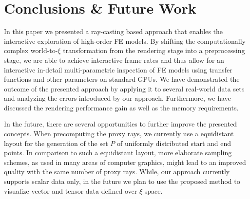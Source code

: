 \documentclass[journal]{vgtc}                %
\begin{document}
\section{Conclusions \& Future Work}\label{sec:conclusions}
In this paper we presented a ray-casting based approach that enables the interactive exploration of high-order FE models. By shifting the computationally complex world-to-$\xi$ transformation from the rendering stage into a preprocessing stage, we are able to achieve interactive frame rates and thus allow for an interactive in-detail multi-parametric inspection of FE models using transfer functions and other parameters on standard GPUs. We have demonstrated the outcome of the presented approach by applying it to several real-world data sets and analyzing the errors introduced by our approach. Furthermore, we have discussed the rendering performance gain as well as the memory requirements.

In the future, there are several opportunities to further improve the presented concepts. When precomputing the proxy rays, we currently use a equidistant layout for the generation of the set $P$ of uniformly distributed start and end points. In comparison to such a equidistant layout, more elaborate sampling schemes, as used in many areas of computer graphics, might lead to an improved quality with the same number of proxy rays. While, our approach currently supports scalar data only, in the future we plan to use the proposed method to visualize vector and tensor data defined over $\xi$ space.
%
%
%



\end{document}
